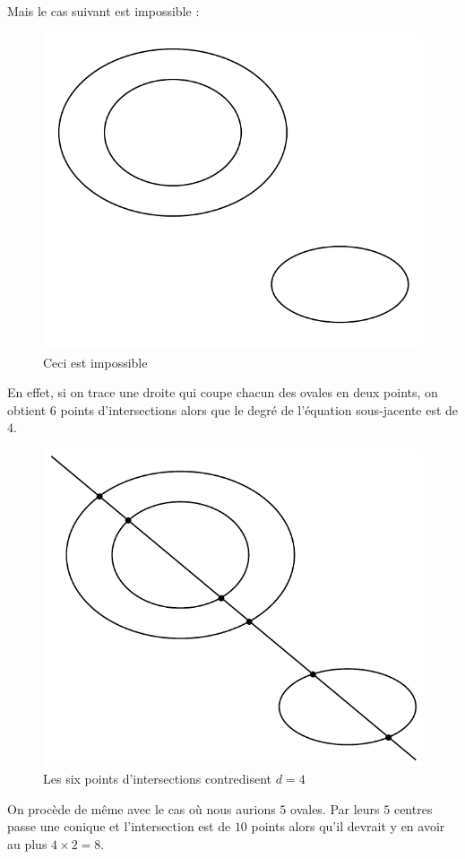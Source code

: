 \documentclass{livre}
\begin{document}
Mais le cas suivant est impossible :
\begin{figure}[H]
\begin{center}
\includegraphics[scale=0.6]{Figures/fig2}
\end{center}
\caption{Ceci est impossible}
\end{figure}
En effet, si on trace une droite qui coupe chacun des ovales en deux points, on obtient $6$ points d'intersections alors que le degré de l'équation sous-jacente est de $4$.
\begin{figure}[H]
\begin{center}
\includegraphics[scale=0.55]{Figures/fig3}
\end{center}
\caption{Les six points d'intersections contredisent $d=4$}
\end{figure}

On procède de même avec le cas où nous aurions $5$ ovales. Par leurs $5$ centres passe une conique et l'intersection est de $10$ points alors qu'il devrait y en avoir au plus $4\times 2 = 8$.
\end{document}
